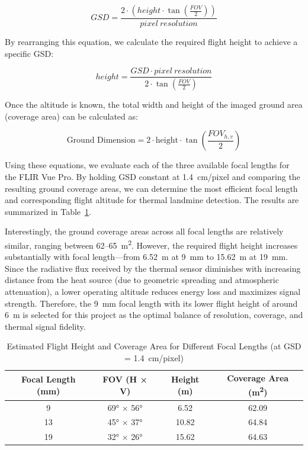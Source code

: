 \begin{equation}
    GSD = \frac{2 \cdot (height \cdot \tan(\frac{FOV}{2}))}{pixel\ resolution}
\end{equation}

By rearranging this equation, we calculate the required flight height to achieve a specific GSD:

\begin{equation}
    height = \frac{GSD \cdot pixel\ resolution}{2 \cdot \tan(\frac{FOV}{2})}
\end{equation}

Once the altitude is known, the total width and height of the imaged ground area (coverage area) can be calculated as:

\begin{equation}
    \text{Ground Dimension} = 2 \cdot \text{height} \cdot 
    \tan\left(\frac{FOV_{h,v}}{2}\right)
\end{equation}

Using these equations, we evaluate each of the three available focal lengths for the FLIR Vue Pro. By holding GSD constant at 1.4~cm/pixel and comparing the resulting ground coverage areas, we can determine the most efficient focal length and corresponding flight altitude for thermal landmine detection. The results are summarized in Table~\ref{tab:fov_results}. 

Interestingly, the ground coverage areas across all focal lengths are relatively similar, ranging between 62–65~m\textsuperscript{2}. However, the required flight height increases substantially with focal length—from 6.52~m at 9~mm to 15.62~m at 19~mm. Since the radiative flux received by the thermal sensor diminishes with increasing distance from the heat source (due to geometric spreading and atmospheric attenuation), a lower operating altitude reduces energy loss and maximizes signal strength. Therefore, the 9~mm focal length with its lower flight height of around 6~m is selected for this project as the optimal balance of resolution, coverage, and thermal signal fidelity.

\begin{table}[H]
\centering
\caption{Estimated Flight Height and Coverage Area for Different Focal Lengths (at GSD = 1.4~cm/pixel)}
\label{tab:fov_results}
\begin{tabular}{|c|c|c|c|}
\hline
\textbf{Focal Length (mm)} & \textbf{FOV (H × V)} & \textbf{Height (m)} & \textbf{Coverage Area (m\textsuperscript{2})} \\
\hline
9  & 69° × 56° & 6.52   & 62.09  \\
\hline
13 & 45° × 37° & 10.82  & 64.84  \\
\hline
19 & 32° × 26° & 15.62  & 64.63  \\
\hline
\end{tabular}
\end{table}

